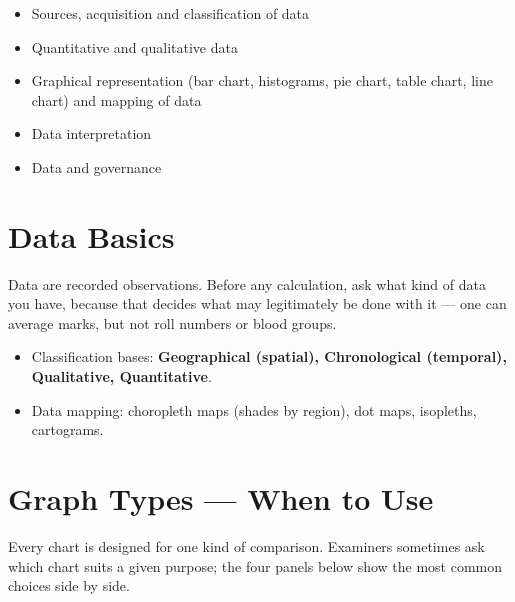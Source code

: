 

\begin{sylbox}

\begin{itemize}
\tightlist
\item[$\square$]
  Sources, acquisition and classification of data
\item[$\square$]
  Quantitative and qualitative data
\item[$\square$]
  Graphical representation (bar chart, histograms, pie chart, table chart, line chart) and mapping of data
\item[$\square$]
  Data interpretation
\item[$\square$]
  Data and governance
\end{itemize}

\end{sylbox}

\needspace{125pt}

\hypertarget{p1-07--1-data-basics}{%
\section{Data Basics}\label{p1-07--1-data-basics}}

Data are recorded observations. Before any calculation, ask what kind of data you have, because that
decides what may legitimately be done with it --- one can average marks, but not roll numbers or
blood groups.



\begin{itemize}
\tightlist
\item
  Classification bases: \textbf{Geographical (spatial), Chronological (temporal), Qualitative, Quantitative}.
\item
  Data mapping: choropleth maps (shades by region), dot maps, isopleths, cartograms.
\end{itemize}

\needspace{125pt}

\hypertarget{p1-07--2-graph-types--when-to-use}{%
\section{Graph Types --- When to Use}\label{p1-07--2-graph-types--when-to-use}}

Every chart is designed for one kind of comparison. Examiners sometimes ask which chart suits a given
purpose; the four panels below show the most common choices side by side.

